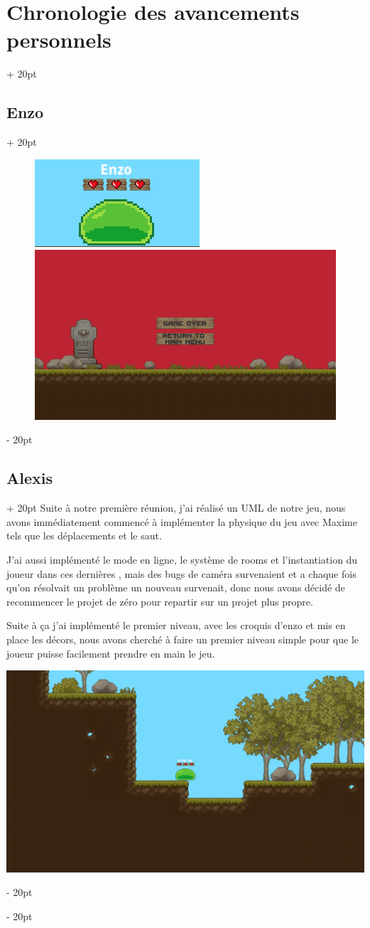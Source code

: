 \documentclass[a4paper, 12pt, twoside]{article}
\newcommand{\ind}[1][20pt]{\advance\leftskip + #1}
\newcommand{\deind}[1][20pt]{\advance\leftskip - #1}
\newenvironment{indt}[2][20pt]{#2 \par \ind[#1]}{\par \deind} %
\begin{document}
\begin{indt}{\section{Chronologie des avancements personnels}}
\begin{indt}{\subsection{Enzo}}
            \begin{figure}
                \includegraphics[width=0.49\linewidth]{Slime1.png}\hfill \hfill\includegraphics[width=0.49\linewidth]{GameOver.png}
            \end{figure}
        \end{indt}

        \begin{indt}{\subsection{Alexis}}
            Suite à notre première réunion, j'ai réalisé un UML de notre jeu, nous avons immédiatement commencé à implémenter la physique du jeu avec Maxime tels que les déplacements et le saut.

            J'ai aussi implémenté le mode en ligne, le système de rooms et l'instantiation du joueur dans ces dernières , mais des bugs de caméra survenaient et a chaque fois qu'on résolvait un problème un nouveau survenait, donc nous avons décidé de recommencer le projet de zéro pour repartir sur un projet plus propre.

            Suite à ça j'ai implémenté le premier niveau, avec les croquis d'enzo et mis en place les décors, nous avons cherché à faire un premier niveau simple pour que le joueur puisse facilement prendre en main le jeu.

            \begin{center}
                \includegraphics[width=0.8\linewidth]{Lvl1.png}
            \end{center}
        \end{indt}


\end{indt}
\end{document}
